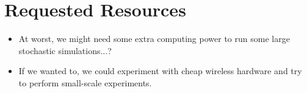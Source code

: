 \documentclass{article}
\begin{document}
\section*{Requested Resources}
\begin{itemize}
	\item At worst, we might need some extra computing power to run some large stochastic simulations...?
	\item If we wanted to, we could experiment with cheap wireless hardware and try to perform small-scale experiments.
\end{itemize}
\end{document}
